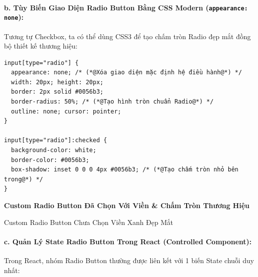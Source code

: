 \documentclass[11pt,oneside]{book}
\newcommand{\codeinline}[1]{\textcolor{accentOrange}{\texttt{#1}}}
\begin{document}
\paragraph{b. Tùy Biến Giao Diện Radio Button Bằng CSS Modern (\codeinline{appearance: none}):}
Tương tự Checkbox, ta có thể dùng CSS3 để tạo chấm tròn Radio đẹp mắt đồng bộ thiết kế thương hiệu:

\begin{codeWindow}
\begin{lstlisting}[language=HTML5]
input[type="radio"] {
  appearance: none; /* (*@Xóa giao diện mặc định hệ điều hành@*) */
  width: 20px; height: 20px;
  border: 2px solid #0056b3;
  border-radius: 50%; /* (*@Tạo hình tròn chuẩn Radio@*) */
  outline: none; cursor: pointer;
}

input[type="radio"]:checked {
  background-color: white;
  border-color: #0056b3;
  box-shadow: inset 0 0 0 4px #0056b3; /* (*@Tạo chấm tròn nhỏ bên trong@*) */
}
\end{lstlisting}
\end{codeWindow}

\begin{browserWindow}
\sffamily\small
{} \;\textbf{Custom Radio Button Đã Chọn Với Viền \& Chấm Tròn Thương Hiệu} \\[6pt]
 \; Custom Radio Button Chưa Chọn Viền Xanh Đẹp Mắt
\end{browserWindow}

\paragraph{c. Quản Lý State Radio Button Trong React (Controlled Component):}
Trong React, nhóm Radio Button thường được liên kết với 1 biến State chuỗi duy nhất:
\end{document}
